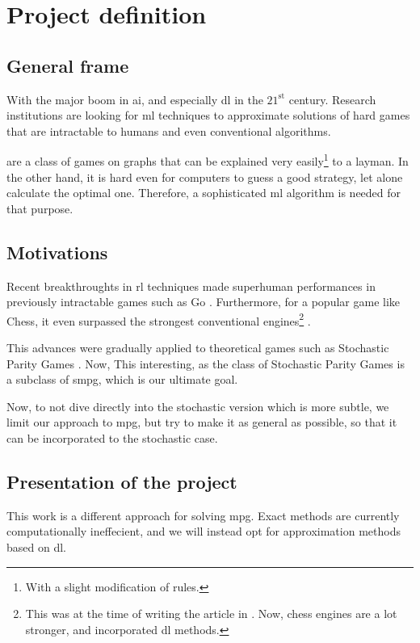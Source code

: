 \section{Project definition}
\subsection{General frame}
With the major boom in \acrlong{ai}, and especially \acrlong{dl} in the $21^\text{st}$ century. Research institutions are looking for \acrlong{ml} techniques to approximate solutions of hard games that are intractable to humans and even conventional algorithms.

 are a class of games on graphs that can be explained very easily\footnote{With a slight modification of rules.} to a layman. In the other hand, it is hard even for computers to guess a good strategy, let alone calculate the optimal one. Therefore, a sophisticated \acrshort{ml} algorithm is needed for that purpose.

\subsection{Motivations}
Recent breakthroughts in \acrlong{rl} techniques made superhuman performances in previously intractable games such as Go \cite{AlphaGo}.
\newline Furthermore, for a popular game like Chess, it even surpassed the strongest conventional engines\footnote{This was at the time of writing the article in . Now, chess engines are a lot stronger, and incorporated \acrshort{dl} methods.} \cite{AlphaZero}. 

This advances were gradually applied to theoretical games such as Stochastic Parity Games \cite{ModelFreeParityGame}.
\newline Now, This interesting, as the class of Stochastic Parity Games is a subclass of \acrfull{smpg}, which is our ultimate goal.

Now, to not dive directly into the stochastic version which is more subtle, we limit our approach to \acrfull{mpg}, but try to make it as general as possible, so that it can be incorporated to the stochastic case. 

\subsection{Presentation of the project}
This work is a different approach for solving \acrshort{mpg}. Exact methods are currently computationally ineffecient, and we will instead opt for approximation methods based on \acrshort{dl}.

